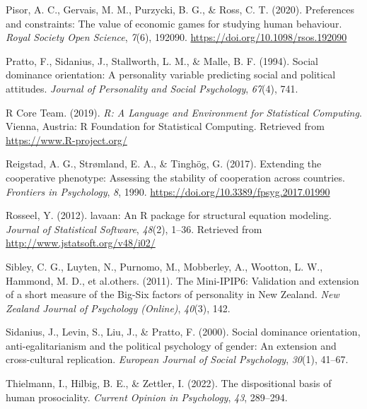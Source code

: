 \documentclass[
  man,floatsintext]{apa6}
\newlength{\cslhangindent}
\newlength{\cslentryspacingunit} %
\newenvironment{CSLReferences}[2] %
 {%
  \setlength{\parindent}{0pt}
  \ifodd #1
  \let\oldpar\par
  \def\par{\hangindent=\cslhangindent\oldpar}
  \fi
  \setlength{\parskip}{#2\cslentryspacingunit}
 }%
 {}
\begin{document}
\begin{CSLReferences}{1}{0}
\leavevmode{}%
Pisor, A. C., Gervais, M. M., Purzycki, B. G., \& Ross, C. T. (2020). Preferences and constraints: The value of economic games for studying human behaviour. \emph{Royal Society Open Science}, \emph{7}(6), 192090. \url{https://doi.org/10.1098/rsos.192090}

\leavevmode{}%
Pratto, F., Sidanius, J., Stallworth, L. M., \& Malle, B. F. (1994). Social dominance orientation: A personality variable predicting social and political attitudes. \emph{Journal of Personality and Social Psychology}, \emph{67}(4), 741.

\leavevmode{}%
R Core Team. (2019). \emph{{R: A Language and Environment for Statistical Computing}}. Vienna, Austria: R Foundation for Statistical Computing. Retrieved from \url{https://www.R-project.org/}

\leavevmode{}%
Reigstad, A. G., Strømland, E. A., \& Tinghög, G. (2017). Extending the cooperative phenotype: Assessing the stability of cooperation across countries. \emph{Frontiers in Psychology}, \emph{8}, 1990. \url{https://doi.org/10.3389/fpsyg.2017.01990}

\leavevmode{}%
Rosseel, Y. (2012). {lavaan}: An {R} package for structural equation modeling. \emph{Journal of Statistical Software}, \emph{48}(2), 1--36. Retrieved from \url{http://www.jstatsoft.org/v48/i02/}

\leavevmode{}%
Sibley, C. G., Luyten, N., Purnomo, M., Mobberley, A., Wootton, L. W., Hammond, M. D., et al.others. (2011). The {M}ini-{IPIP}6: Validation and extension of a short measure of the {B}ig-{S}ix factors of personality in {N}ew {Z}ealand. \emph{New Zealand Journal of Psychology (Online)}, \emph{40}(3), 142.

\leavevmode{}%
Sidanius, J., Levin, S., Liu, J., \& Pratto, F. (2000). Social dominance orientation, anti-egalitarianism and the political psychology of gender: An extension and cross-cultural replication. \emph{European Journal of Social Psychology}, \emph{30}(1), 41--67.

\leavevmode{}%
Thielmann, I., Hilbig, B. E., \& Zettler, I. (2022). The dispositional basis of human prosociality. \emph{Current Opinion in Psychology}, \emph{43}, 289--294.


\end{CSLReferences}
\end{document}
